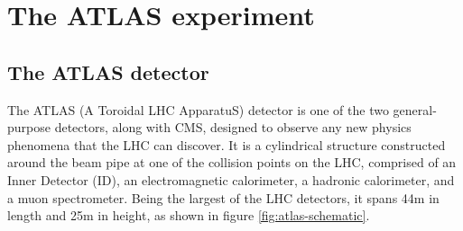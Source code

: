 \chapter{The ATLAS experiment}
\label{chap:ATLAS-detector}




\section{The ATLAS detector}
The ATLAS (A Toroidal LHC ApparatuS) detector is one of the two general-purpose detectors, along with CMS, designed to observe any new physics phenomena that the LHC can discover. It is a cylindrical structure constructed around the beam pipe at one of the collision points on the LHC, comprised of an Inner Detector (ID), an electromagnetic calorimeter, a hadronic calorimeter, and a muon spectrometer. Being the largest of the LHC detectors, it spans 44m in length and 25m in height, as shown in figure \ref{fig:atlas-schematic}.

